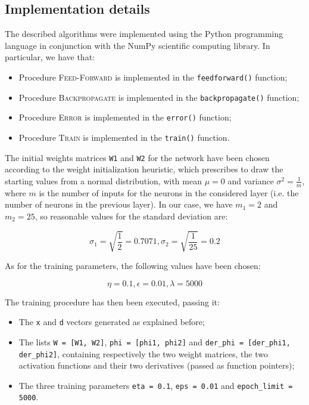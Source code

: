 \documentclass[letterpaper,headings=standardclasses]{scrartcl}
\begin{document}
\subsection{Implementation details}

The described algorithms were implemented using the Python programming language in conjunction with the NumPy scientific computing library. In particular, we have that:

\begin{itemize}
    \item Procedure \textsc{Feed-Forward} is implemented in the \texttt{feedforward()} function;
    \item Procedure \textsc{Backpropagate} is implemented in the \texttt{backpropagate()} function;
    \item Procedure \textsc{Error} is implemented in the \texttt{error()} function;
    \item Procedure \textsc{Train} is implemented in the \texttt{train()} function.
\end{itemize}

The initial weights matrices \texttt{W1} and \texttt{W2} for the network have been chosen according to the weight initialization heuristic, which prescribes to draw the starting values from a normal distribution, with mean $\mu = 0$ and variance $\sigma^2 = \frac{1}{m}$, where $m$ is the number of inputs for the neurons in the considered layer (i.e. the number of neurons in the previous layer). In our case, we have $m_1 = 2$ and $m_2 = 25$, so reasonable values for the standard deviation are:

$$ \sigma_1 = \sqrt{\frac{1}{2}} = 0.7071, \sigma_2 = \sqrt{\frac{1}{25}} = 0.2 $$

As for the training parameters, the following values have been chosen:

$$ \eta = 0.1, \epsilon = 0.01, \lambda = 5000 $$

The training procedure has then been executed, passing it:

\begin{itemize}
    \item The \texttt{x} and \texttt{d} vectors generated as explained before;
    \item The lists \texttt{W = [W1, W2]}, \texttt{phi = [phi1, phi2]} and \texttt{der\_phi = [der\_phi1, der\_phi2]}, containing respectively the two weight matrices, the two activation functions and their two derivatives (passed as function pointers);
    \item The three training parameters \texttt{eta = 0.1}, \texttt{eps = 0.01} and \texttt{epoch\_limit = 5000}.
\end{itemize}
\end{document}
